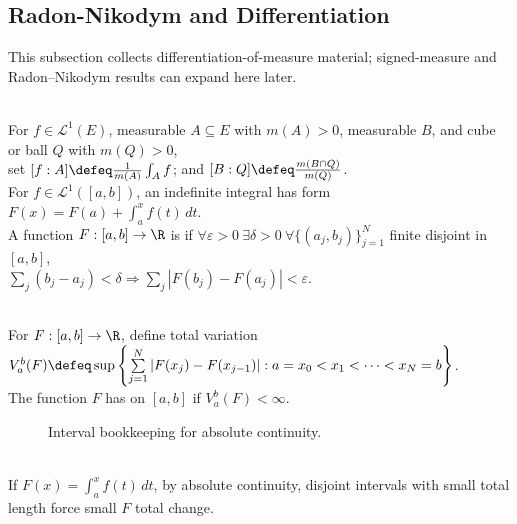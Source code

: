\subsection{Radon-Nikodym and Differentiation}

%

This subsection collects differentiation-of-measure material; signed-measure and Radon--Nikodym results can expand here later.

\begin{definition} \label{def:lebesgue-averages-and-absolute-continuity} \\
For $f\in\mathscr{L}^1(E)$, measurable $A\subseteq E$ with $m(A)>0$, measurable $B$, and cube or ball $Q$ with $m(Q)>0$,\\
set $[f:A]\defeq \frac{1}{m(A)}\int_A f$; and $[B:Q]\defeq \frac{m(B\cap Q)}{m(Q)}$.\\
For $f\in\mathscr{L}^1([a,b])$, an indefinite integral has form $F(x)=F(a)+\int_a^x f(t)\,dt$.\\
A function $F:[a,b]\to\R$ is  if $\forall\varepsilon>0\ \exists\delta>0\ \forall\{(a_j,b_j)\}_{j=1}^N$ finite disjoint in $[a,b]$,\\
$\sum_j(b_j-a_j)<\delta \Longrightarrow \sum_j |F(b_j)-F(a_j)|<\varepsilon$.
\end{definition}

\begin{definition} \label{def:bounded-variation-one-variable} \\
For $F:[a,b]\to\R$, define total variation $V_a^b(F)\defeq \sup\left\{\sum\limits_{j=1}^N |F(x_j)-F(x_{j-1})|: a=x_0<x_1<\cdots<x_N=b \right\}$.\\
The function $F$ has  on $[a,b]$ if $V_a^b(F)<\infty$.
\end{definition}

\begin{figure}[H]
  \centering
  
  \caption{Interval bookkeeping for absolute continuity.}
  \label{fig:absolute-continuity-interval-decomposition}
\end{figure}

\begin{perspective} \label{per:absolute-continuity-interval-bookkeeping} \\
If $F(x)=\int_a^x f(t)\,dt$, by absolute continuity, disjoint intervals with small total length force small $F$ total change.\\
\end{perspective}

